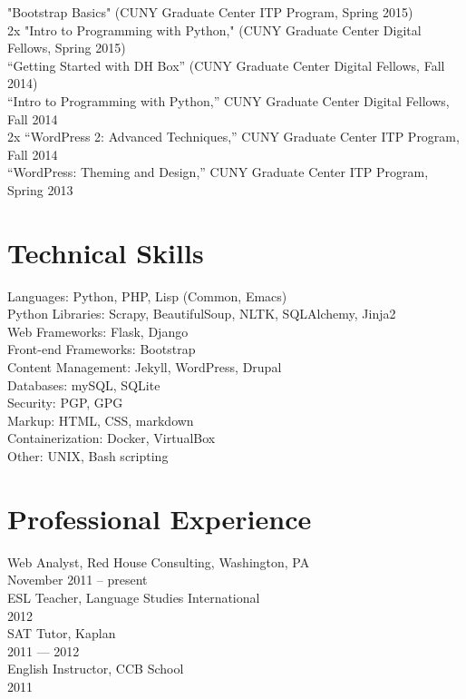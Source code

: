 \documentclass[11pt]{article}
\begin{document}
"Bootstrap Basics" (CUNY Graduate Center ITP Program, Spring 2015)\\
2x "Intro to Programming with Python," (CUNY Graduate Center Digital Fellows, Spring 2015)\\
“Getting Started with DH Box” (CUNY Graduate Center Digital Fellows, Fall 2014)\\
“Intro to Programming with Python,” CUNY Graduate Center Digital Fellows, Fall 2014\\
2x “WordPress 2: Advanced Techniques,” CUNY Graduate Center ITP Program, Fall 2014\\
“WordPress: Theming and Design,” CUNY Graduate Center ITP Program, Spring 2013\\

\section*{Technical Skills}
\label{sec:orgheadline11}

Languages: Python, PHP, Lisp (Common, Emacs)\\
Python Libraries: Scrapy, BeautifulSoup, NLTK, SQLAlchemy, Jinja2\\
Web Frameworks: Flask, Django\\
Front-end Frameworks: Bootstrap\\
Content Management: Jekyll, WordPress, Drupal\\
Databases: mySQL, SQLite\\
Security: PGP, GPG\\
Markup: HTML, CSS, markdown\\
Containerization: Docker, VirtualBox\\
Other: UNIX, Bash scripting\\
\section*{Professional Experience}
\label{sec:orgheadline12}

Web Analyst, Red House Consulting, Washington, PA\\
November 2011 – present\\

ESL Teacher, Language Studies International\\
2012\\

SAT Tutor, Kaplan\\
2011 — 2012\\

English Instructor, CCB School\\
2011\\
\end{document}
